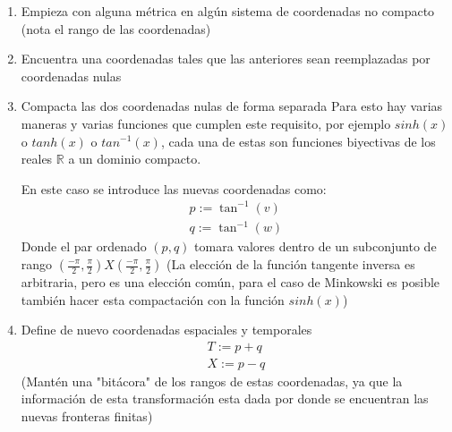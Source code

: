 \begin{enumerate}
    \item Empieza con alguna métrica en algún sistema de coordenadas no compacto (nota el rango de las coordenadas)
    \item Encuentra una coordenadas tales que las anteriores sean reemplazadas por coordenadas nulas
    \item Compacta las dos coordenadas nulas de forma separada
          Para esto hay varias maneras y varias funciones que cumplen este requisito, por ejemplo $sinh(x)$ o $tanh(x)$ o $tan^{-1}(x)$, cada una de estas son funciones biyectivas de los reales $\mathbb{R} $ a un dominio compacto.


          En este caso se introduce las nuevas coordenadas como:
          \begin{equation}
              \begin{array}{l}
                  p:=\tan ^{-1}(v) \\
                  q:=\tan ^{-1}(w)
              \end{array}
          \end{equation}
          Donde el par ordenado $(p,q)$ tomara valores dentro de un subconjunto de rango
          $(\frac{-\pi}{2},\frac{\pi}{2})X(\frac{-\pi}{2},\frac{\pi}{2})$
          (La elección  de la función tangente inversa es arbitraria, pero es una elección común, para el caso de Minkowski es posible también hacer  esta compactación con la función $sinh(x)$)
    \item Define de nuevo coordenadas espaciales y temporales
          \begin{equation}
              \begin{array}{l}
                  T:=p+q \\
                  X:=p-q
              \end{array}
          \end{equation}
          (Mantén una "bitácora" de los rangos de estas coordenadas, ya que la información de esta transformación esta dada por donde se encuentran las nuevas fronteras finitas)
\end{enumerate}
